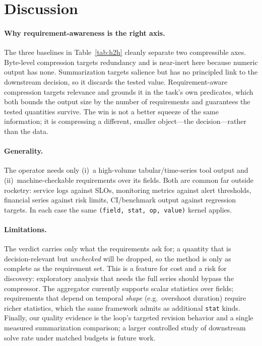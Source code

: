 \documentclass[10pt,twocolumn]{article}
\begin{document}
\section{Discussion}
\label{sec:discuss}

\paragraph{Why requirement-awareness is the right axis.}
The three baselines in Table~\ref{tab:h2h} cleanly separate two compressible axes.
Byte-level compression targets redundancy and is near-inert here because numeric
output has none. Summarization targets salience but has no principled link to the
downstream decision, so it discards the tested value. Requirement-aware compression
targets relevance and grounds it in the task's own predicates, which both bounds the
output size by the number of requirements and guarantees the tested quantities
survive. The win is not a better squeeze of the same information; it is compressing
a different, smaller object---the decision---rather than the data.

\paragraph{Generality.}
The operator needs only (i)~a high-volume tabular/time-series tool output and
(ii)~machine-checkable requirements over its fields. Both are common far outside
rocketry: service logs against SLOs, monitoring metrics against alert thresholds,
financial series against risk limits, CI/benchmark output against regression
targets. In each case the same \texttt{(field, stat, op, value)} kernel applies.

\paragraph{Limitations.}
The verdict carries only what the requirements ask for; a quantity that is
decision-relevant but \emph{unchecked} will be dropped, so the method is only as
complete as the requirement set. This is a feature for cost and a risk for
discovery: exploratory analysis that needs the full series should bypass the
compressor. The aggregator currently supports scalar statistics over fields;
requirements that depend on temporal \emph{shape} (e.g.\ overshoot duration) require
richer statistics, which the same framework admits as additional \texttt{stat}
kinds. Finally, our quality evidence is the loop's targeted revision behavior and a
single measured summarization comparison; a larger controlled study of downstream
solve rate under matched budgets is future work.
\end{document}
